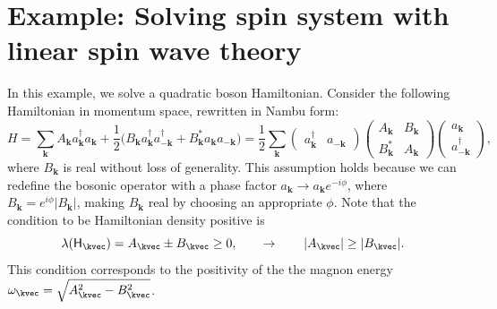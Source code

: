 \section{Example: Solving spin system with linear spin wave theory}

In this example, we solve a quadratic boson Hamiltonian. Consider the following Hamiltonian in momentum space, rewritten in Nambu form:
\begin{equation}
    H = \sum_{\mathbf{k}} A_{\mathbf{k}} a^{\dagger}_{\mathbf{k}} a_{\mathbf{k}} + \frac{1}{2} \Big( B_{\mathbf{k}} a^{\dagger}_{\mathbf{k}} a^{\dagger}_{-\mathbf{k}} + B_{\mathbf{k}}^{*} a_{\mathbf{k}} a_{-\mathbf{k}} \Big) 
    = \frac{1}{2} \sum_{\mathbf{k}}
    \begin{pmatrix}
        a^{\dagger}_{\mathbf{k}} & a_{-\mathbf{k}}
    \end{pmatrix}
    \begin{pmatrix}
        A_{\mathbf{k}} & B_{\mathbf{k}} \\
        B_{\mathbf{k}}^{*} & A_{\mathbf{k}}
    \end{pmatrix}
    \begin{pmatrix}
        a_{\mathbf{k}} \\
        a^{\dagger}_{-\mathbf{k}}
    \end{pmatrix},
\end{equation}
where $ B_{\mathbf{k}} $ is real without loss of generality. This assumption holds because we can redefine the bosonic operator with a phase factor $ a_{\mathbf{k}} \to a_{\mathbf{k}} e^{-i\phi} $, where $ B_{\mathbf{k}} = e^{i\phi} |B_{\mathbf{k}}| $, making $ B_{\mathbf{k}} $ real by choosing an appropriate $ \phi $.
Note that the condition to be Hamiltonian density positive is 
\begin{equation*}
    \lambda(\mathsf{H}_{\kvec}) = A_{\kvec} \pm B_{\kvec} \ge 0, 
    \qquad \rightarrow \qquad
    | A_{\kvec} | \ge | B_{\kvec} |.
\end{equation*}
This condition corresponds to the positivity of the the magnon energy $\omega_{\kvec} = \sqrt{A_{\kvec}^{2} - B_{\kvec}^{2}}$.

